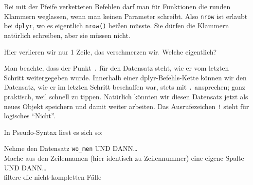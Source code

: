 \documentclass[12pt,ngerman,]{book}
\newenvironment{Shaded}{\begin{snugshade}}{\end{snugshade}}
\newcommand{\KeywordTok}[1]{\textcolor[rgb]{0.13,0.29,0.53}{\textbf{{#1}}}}
\newcommand{\StringTok}[1]{\textcolor[rgb]{0.31,0.60,0.02}{{#1}}}
\newcommand{\CommentTok}[1]{\textcolor[rgb]{0.56,0.35,0.01}{\textit{{#1}}}}
\newcommand{\NormalTok}[1]{{#1}}
\renewenvironment{Shaded}{\begin{kframe}}{\end{kframe}}
\let\BeginKnitrBlock\begin \let\EndKnitrBlock\end
\begin{document}
\begin{Shaded}
\end{Shaded}

\BeginKnitrBlock{rmdcaution}
Bei mit der Pfeife verketteten Befehlen darf man für Funktionen die
runden Klammern weglassen, wenn man keinen Parameter schreibt. Also
\texttt{nrow} ist erlaubt bei \texttt{dplyr}, wo es eigentlich
\texttt{nrow()} heißen müsste. Sie dürfen die Klammern natürlich
schreiben, aber sie müssen nicht.
\EndKnitrBlock{rmdcaution}

Hier verlieren wir nur 1 Zeile, das verschmerzen wir. Welche eigentlich?

\begin{Shaded}
\end{Shaded}

Man beachte, dass der Punkt \texttt{.} für den Datensatz steht, wie er
vom letzten Schritt weitergegeben wurde. Innerhalb einer
dplyr-Befehls-Kette können wir den Datensatz, wie er im letzten Schritt
beschaffen war, stets mit \texttt{.} ansprechen; ganz praktisch, weil
schnell zu tippen. Natürlich könnten wir diesen Datensatz jetzt als
neues Objekt speichern und damit weiter arbeiten. Das Ausrufezeichen
\texttt{!} steht für logisches ``Nicht''.

In Pseudo-Syntax liest es sich so:

\BeginKnitrBlock{rmdpseudocode}
Nehme den Datensatz \texttt{wo\_men} UND DANN\ldots{}\\
Mache aus den Zeilennamen (hier identisch zu Zeilennummer) eine eigene
Spalte UND DANN\ldots{}\\
filtere die nicht-kompletten Fälle
\EndKnitrBlock{rmdpseudocode}
\end{document}
